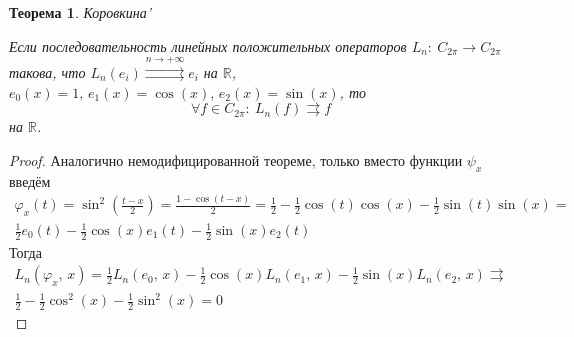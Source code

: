 \documentclass[a4paper,12pt]{article}
\renewcommand{\phi}{\ensuremath{\varphi}}
\theoremstyle{plain}
\newtheorem{theorem}{Теорема}[section]
\theoremstyle{definition}
\theoremstyle{remark}
\begin{document}
\begin{theorem}
	Коровкина'

	Если последовательность линейных положительных операторов $L_n:\: C_{2\pi} \to C_{2\pi}$ такова, что $L_n(e_i) \stackrel{n \to +\infty}{\rightrightarrows} e_i$ на $\mathbb{R}$, $e_0(x) = 1,\, e_1(x) = \cos(x),\, e_2(x) = \sin(x)$, то
	\[\forall f \in C_{2\pi}:\: L_n(f) \rightrightarrows f\]
	на $\mathbb{R}$.
\end{theorem}

\begin{proof}
	Аналогично немодифицированной теореме, только вместо функции $\psi_x$ введём
	\begin{align*}
		\phi_x(t) = \sin^2(\frac{t - x}{2}) = \frac{1 - \cos(t - x)}{2} = \frac{1}{2} - \frac{1}{2}\cos(t)\cos(x) - \frac{1}{2}\sin(t)\sin(x) = \\
		\frac{1}{2}e_0(t) - \frac{1}{2}\cos(x)e_1(t) - \frac{1}{2}\sin(x)e_2(t)
	\end{align*}
	Тогда
	\begin{align*}
		L_n(\phi_x,\, x) = \frac{1}{2}L_n(e_0,\,x) - \frac{1}{2}\cos(x)L_n(e_1,\,x) - \frac{1}{2}\sin(x)L_n(e_2,\,x) \rightrightarrows \\
		\frac{1}{2} - \frac{1}{2}\cos^2(x) - \frac{1}{2}\sin^2(x) = 0
	\end{align*}
\end{proof}
\end{document}
